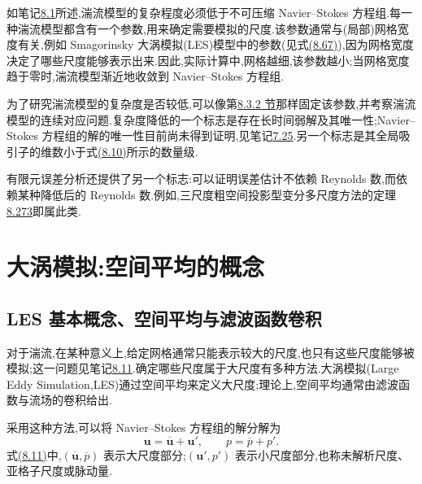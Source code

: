 \begin{note}[湍流模型的复杂度较低]
\label{note:smaller-complexity-turbulence-models}
如笔记\hyperref[note:turbulent-flows]{8.1}所述,湍流模型的复杂程度必须低于不可压缩 Navier--Stokes 方程组.每一种湍流模型都含有一个参数,用来确定需要模拟的尺度.该参数通常与(局部)网格宽度有关,例如 Smagorinsky 大涡模拟(LES)模型中的参数(见式\hyperref[eq:smagorinsky-filter-width]{(8.67)}),因为网格宽度决定了哪些尺度能够表示出来.因此,实际计算中,网格越细,该参数越小;当网格宽度趋于零时,湍流模型渐近地收敛到 Navier--Stokes 方程组.

为了研究湍流模型的复杂度是否较低,可以像第\hyperref[sec:smagorinsky-analysis]{8.3.2 节}那样固定该参数,并考察湍流模型的连续对应问题.复杂度降低的一个标志是存在长时间弱解及其唯一性;Navier--Stokes 方程组的解的唯一性目前尚未得到证明,见笔记\hyperref[note:time-dependent-three-dimensional-uniqueness]{7.25}.另一个标志是其全局吸引子的维数小于式\hyperref[eq:hausdorff-dimension-three-dimensional-invariant-set]{(8.10)}所示的数量级.

有限元误差分析还提供了另一个标志:可以证明误差估计不依赖 Reynolds 数,而依赖某种降低后的 Reynolds 数.例如,三尺度粗空间投影型变分多尺度方法的定理\hyperref[thm:three-level-projection-vms-velocity-error]{8.273}即属此类.
\end{note}

\section{大涡模拟:空间平均的概念}
\label{sec:large-eddy-space-averaging}

\subsection{LES 基本概念、空间平均与滤波函数卷积}
\label{subsec:les-basic-concept-space-averaging}

\begin{note}[大涡模拟的基本思想]
\label{note:large-eddy-simulation-basic-idea}
对于湍流,在某种意义上,给定网格通常只能表示较大的尺度,也只有这些尺度能够被模拟;这一问题见笔记\hyperref[note:kolmogorov-scales-numerical-impact]{8.11}.确定哪些尺度属于大尺度有多种方法.大涡模拟(Large Eddy Simulation,LES)通过空间平均来定义大尺度;理论上,空间平均通常由滤波函数与流场的卷积给出.

采用这种方法,可以将 Navier--Stokes 方程组的解分解为
\begin{equation}\label{eq:les-scale-decomposition}
 \bm{u}=\overline{\bm{u}}+\bm{u}',
 \qquad
 p=\overline{p}+p'.
\end{equation}
式\hyperref[eq:les-scale-decomposition]{(8.11)}中,$(\overline{\bm{u}},\overline{p})$ 表示大尺度部分;$(\bm{u}',p')$ 表示小尺度部分,也称未解析尺度、亚格子尺度或脉动量.
\end{note}

